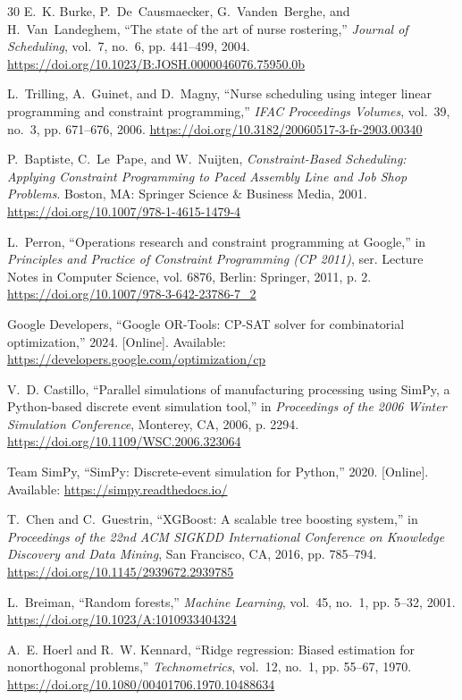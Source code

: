 \documentclass[11pt,a4paper]{article}
\begin{document}
\begin{thebibliography}{30}
E.~K. Burke, P.~De~Causmaecker, G.~Vanden~Berghe, and H.~Van~Landeghem, ``The state of the art of nurse rostering,'' \emph{Journal of Scheduling}, vol.~7, no.~6, pp. 441--499, 2004. \url{https://doi.org/10.1023/B:JOSH.0000046076.75950.0b}

L.~Trilling, A.~Guinet, and D.~Magny, ``Nurse scheduling using integer linear programming and constraint programming,'' \emph{IFAC Proceedings Volumes}, vol.~39, no.~3, pp. 671--676, 2006. \url{https://doi.org/10.3182/20060517-3-fr-2903.00340}

P.~Baptiste, C.~Le~Pape, and W.~Nuijten, \emph{Constraint-Based Scheduling: Applying Constraint Programming to Paced Assembly Line and Job Shop Problems}. Boston, MA: Springer Science \& Business Media, 2001. \url{https://doi.org/10.1007/978-1-4615-1479-4}

L.~Perron, ``Operations research and constraint programming at Google,'' in \emph{Principles and Practice of Constraint Programming (CP 2011)}, ser. Lecture Notes in Computer Science, vol. 6876, Berlin: Springer, 2011, p. 2. \url{https://doi.org/10.1007/978-3-642-23786-7_2}

Google Developers, ``Google OR-Tools: CP-SAT solver for combinatorial optimization,'' 2024. [Online]. Available: \url{https://developers.google.com/optimization/cp}

V.~D. Castillo, ``Parallel simulations of manufacturing processing using SimPy, a Python-based discrete event simulation tool,'' in \emph{Proceedings of the 2006 Winter Simulation Conference}, Monterey, CA, 2006, p. 2294. \url{https://doi.org/10.1109/WSC.2006.323064}

Team SimPy, ``SimPy: Discrete-event simulation for Python,'' 2020. [Online]. Available: \url{https://simpy.readthedocs.io/}

T.~Chen and C.~Guestrin, ``XGBoost: A scalable tree boosting system,'' in \emph{Proceedings of the 22nd ACM SIGKDD International Conference on Knowledge Discovery and Data Mining}, San Francisco, CA, 2016, pp. 785--794. \url{https://doi.org/10.1145/2939672.2939785}

L.~Breiman, ``Random forests,'' \emph{Machine Learning}, vol.~45, no.~1, pp. 5--32, 2001. \url{https://doi.org/10.1023/A:1010933404324}

A.~E. Hoerl and R.~W. Kennard, ``Ridge regression: Biased estimation for nonorthogonal problems,'' \emph{Technometrics}, vol.~12, no.~1, pp. 55--67, 1970. \url{https://doi.org/10.1080/00401706.1970.10488634}


\end{thebibliography}
\end{document}
